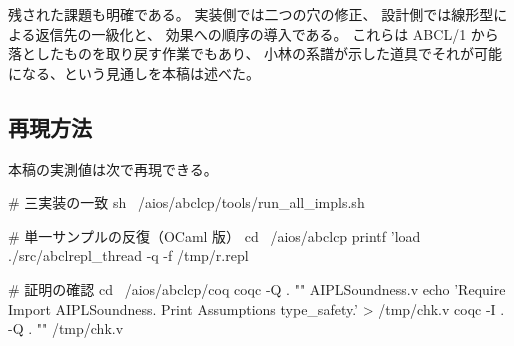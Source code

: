 \documentclass[11pt,a4paper]{ltjsarticle}
\theoremstyle{definition}
\theoremstyle{remark}
\begin{document}
残された課題も明確である。
実装側では二つの穴の修正、
設計側では線形型による返信先の一級化と、
効果への順序の導入である。
これらは ABCL/1 から落としたものを取り戻す作業でもあり、
小林の系譜が示した道具でそれが可能になる、という見通しを本稿は述べた。

\subsection*{再現方法}

本稿の実測値は次で再現できる。

\begin{term}
# 三実装の一致
sh ~/aios/abclcp/tools/run_all_impls.sh

# 単一サンプルの反復（OCaml 版）
cd ~/aios/abclcp
printf 'load %
./src/abclrepl_thread -q -f /tmp/r.repl

# 証明の確認
cd ~/aios/abclcp/coq
coqc -Q . "" AIPLSoundness.v
echo 'Require Import AIPLSoundness. Print Assumptions type_safety.' > /tmp/chk.v
coqc -I . -Q . "" /tmp/chk.v
\end{term}
\end{document}
